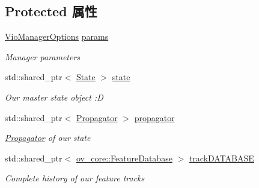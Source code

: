 \subsection*{Protected 属性}
\begin{DoxyCompactItemize}
\item 
\mbox{\label{classov__msckf_1_1VioManager_a69eebf475686d6e17af5f7a5c7f0a8ac}} 
\hyperlink{structov__msckf_1_1VioManagerOptions}{Vio\+Manager\+Options} \hyperlink{classov__msckf_1_1VioManager_a69eebf475686d6e17af5f7a5c7f0a8ac}{params}
\begin{DoxyCompactList}\small\item\em Manager parameters \end{DoxyCompactList}\item 
\mbox{\label{classov__msckf_1_1VioManager_ab5d6a1e35e3630d2b5dde39c3f40d272}} 
std\+::shared\+\_\+ptr$<$ \hyperlink{classov__msckf_1_1State}{State} $>$ \hyperlink{classov__msckf_1_1VioManager_ab5d6a1e35e3630d2b5dde39c3f40d272}{state}
\begin{DoxyCompactList}\small\item\em Our master state object \+:D \end{DoxyCompactList}\item 
\mbox{\label{classov__msckf_1_1VioManager_ab3c7664f03ecef91da5de542d6ac5e47}} 
std\+::shared\+\_\+ptr$<$ \hyperlink{classov__msckf_1_1Propagator}{Propagator} $>$ \hyperlink{classov__msckf_1_1VioManager_ab3c7664f03ecef91da5de542d6ac5e47}{propagator}
\begin{DoxyCompactList}\small\item\em \hyperlink{classov__msckf_1_1Propagator}{Propagator} of our state \end{DoxyCompactList}\item 
\mbox{\label{classov__msckf_1_1VioManager_a4aad25861fa3e5de2102e101e24912ae}} 
std\+::shared\+\_\+ptr$<$ \hyperlink{classov__core_1_1FeatureDatabase}{ov\+\_\+core\+::\+Feature\+Database} $>$ \hyperlink{classov__msckf_1_1VioManager_a4aad25861fa3e5de2102e101e24912ae}{track\+D\+A\+T\+A\+B\+A\+SE}
\begin{DoxyCompactList}\small\item\em Complete history of our feature tracks \end{DoxyCompactList}\item 

\end{DoxyCompactItemize}
